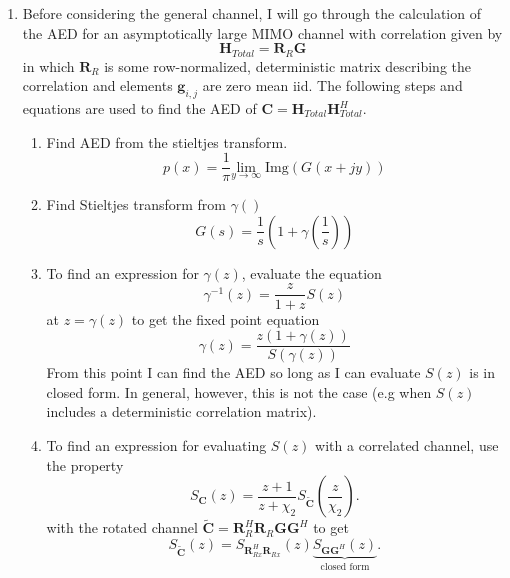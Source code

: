 \documentclass[12pt,a4paper]{report}
\begin{document}
\begin{enumerate}
\item 
	Before considering the general channel,  I will go through the calculation of the AED for an 
	asymptotically large  MIMO channel with correlation given by
	\begin{equation}
	\mathbf{H}_{Total} = \mathbf{R}_{R}\mathbf{G}
	\end{equation}
	in which $\mathbf{R}_{R}$ is some row-normalized, deterministic matrix describing the correlation and
	elements $\mathbf{g}_{i,j}$ are zero mean iid.
	The following steps and equations are used to find the AED of $\mathbf{C} = \mathbf{H}_{Total} \mathbf{H}_{Total}^H$.
	\begin{enumerate}
	\item 
		Find AED from the stieltjes transform.
		\begin{equation}
		p(x) = \frac{1}{\pi} \underset{y \rightarrow \infty}{\text{lim}} \; \text{Img}(G(x+jy))
		\end{equation}
	\item 
		Find Stieltjes transform from $\gamma\left(\right)$
		\begin{equation}
		G(s)=  \frac{1}{s} (1+\gamma\left(\frac{1}{s}\right))
		\end{equation}
	\item 
		To find an expression for $\gamma(z)$, evaluate the equation
		\begin{equation}
		\gamma^{-1}(z) =  \frac{z}{1+z} S(z)
		\end{equation}
		at $z= \gamma(z)$
		to get the fixed point equation
		\begin{equation}
		\gamma(z) = \frac{z(1+ \gamma(z))}{S(\gamma(z))}
		\end{equation}
		From this point I can find the AED so long as I can evaluate $S(z)$ is in closed form. 
		In general, however, this is not the case (e.g when $S(z)$ includes a deterministic correlation matrix). 
	\item 
		To find an expression for evaluating $S(z)$ with a correlated channel, use the property
		\begin{equation}\label{rotation_property}
		S_{\mathbf{C}}(z) = \frac{z+1}{z+\chi_2} S_{\tilde{\mathbf{C}}}\left(\frac{z}{\chi_2}\right).
		\end{equation}
		with the rotated channel $\tilde{\mathbf{C}} = \mathbf{R}_{R}^H\mathbf{R}_{R}\mathbf{G}\mathbf{G}^H$
		to get
		\begin{equation}
		S_{\tilde{\mathbf{C}}}\left( z \right) = S_ {\mathbf{R}_{Rx}^H\mathbf{R}_{Rx}}(z)
		\underbrace{S_ {\mathbf{G}\mathbf{G}^H}(z)}_{\text{closed form}}.

\end{equation}
\end{enumerate}
\end{enumerate}
\end{document}
